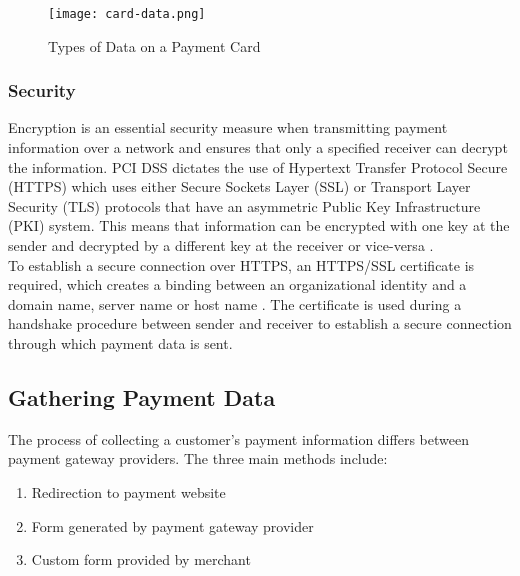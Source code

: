 \begin{figure}[!hbt]
  \centering
 	\texttt{[image: card-data.png]}
  \caption{Types of Data on a Payment Card\cite{card-data}}
 	\label{fig:card-data}
\end{figure}

\subsubsection{Security}
\label{subsec:security}

Encryption is an essential security measure when transmitting payment information over a network and ensures that only a specified receiver can decrypt the information. PCI DSS dictates the use of Hypertext Transfer Protocol Secure (HTTPS) which uses either Secure Sockets Layer (SSL) or Transport Layer Security (TLS) protocols that have an asymmetric Public Key Infrastructure (PKI) system. This means that information can be encrypted with one key at the sender and decrypted by a different key at the receiver or vice-versa \cite{comodo}.\\

To establish a secure connection over HTTPS, an HTTPS/SSL certificate is required, which creates a binding between an organizational identity and a domain name, server name or host name \cite{ssl-certificate}. The certificate is used during a handshake procedure between sender and receiver to establish a secure connection through which payment data is sent.

\subsection{Gathering Payment Data}
\label{subsec:gathering-payment-data}

The process of collecting a customer's payment information differs between payment gateway providers. The three main methods include:

\begin{enumerate}
	\item Redirection to payment website
  \item Form generated by payment gateway provider
  \item Custom form provided by merchant
\end{enumerate}

